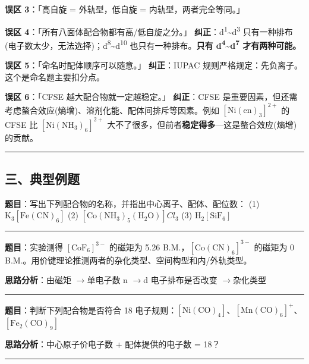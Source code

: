 \documentclass[a4paper,11pt]{ctexart}
\newcommand{\箭}{\ensuremath{\rightarrow}}
\newcommand{\左箭}{\ensuremath{\leftarrow}}
\newcommand{\上箭}{\ensuremath{\uparrow}}
\newcommand{\下箭}{\ensuremath{\downarrow}}
\newcommand{\衡}{\ensuremath{\rightleftharpoons}}
\newcommand{\双箭}{\ensuremath{\leftrightarrow}}
\newcommand{\约等于}{\ensuremath{\approx}}
\newcommand{\小于等于}{\ensuremath{\leq}}
\newcommand{\大于等于}{\ensuremath{\geq}}
\newcommand{\不等于}{\ensuremath{\neq}}
\newcommand{\西格马}{\ensuremath{\sigma}}
\newcommand{\派}{\ensuremath{\pi}}
\begin{document}
\textbf{误区 3}：「高自旋 = 外轨型，低自旋 = 内轨型，两者完全等同。」

\textbf{误区 4}：「所有八面体配合物都有高/低自旋之分。」
\textbf{纠正}：d\textsuperscript{1}\textasciitilde d\textsuperscript{3} 只有一种排布(电子数太少，无法选择)；d\textsuperscript{8}\textasciitilde d\textsuperscript{10} 也只有一种排布。\textbf{只有 d\textsuperscript{4}\textasciitilde d\textsuperscript{7} 才有两种可能。}

\textbf{误区 5}：「命名时配体顺序可以随意。」
\textbf{纠正}：IUPAC 规则严格规定：先负离子。这个是命名题主要扣分点。

\textbf{误区 6}：「CFSE 越大配合物就一定越稳定。」
\textbf{纠正}：CFSE 是重要因素，但还需考虑螯合效应(熵增)、溶剂化能、配体间排斥等因素。例如 \([\mathrm{Ni(en)_3}]^{2+}\) 的 CFSE 比 \([\mathrm{Ni(NH_3)_6}]^{2+}\) 大不了很多，但前者\textbf{稳定得多}---这是螯合效应(熵增)的贡献。

\begin{center}\rule{0.5\linewidth}{0.5pt}\end{center}

\subsection{三、典型例题}\label{ux4e09ux5178ux578bux4f8bux9898}

\textbf{题目}：写出下列配合物的名称，并指出中心离子、配体、配位数：
(1) \(\mathrm{K_3[Fe(CN)_6]}\) (2) \([\mathrm{Co(NH_3)_5(H_2O)}]Cl_3\) (3) \(\mathrm{H_2[SiF_6]}\)

\begin{center}\rule{0.5\linewidth}{0.5pt}\end{center}

\textbf{题目}：实验测得 \([\mathrm{CoF_6}]^{3-}\) 的磁矩为 5.26 B.M.，\([\mathrm{Co(CN)_6}]^{3-}\) 的磁矩为 0 B.M.。用价键理论推测两者的杂化类型、空间构型和内/外轨类型。

\textbf{思路分析}：由磁矩 \箭 单电子数 n \箭 d 电子排布是否改变 \箭 杂化类型

\begin{center}\rule{0.5\linewidth}{0.5pt}\end{center}

\textbf{题目}：判断下列配合物是否符合 18 电子规则：\(\mathrm{[Ni(CO)_4]}\)、\(\mathrm{[Mn(CO)_6]^+}\)、\(\mathrm{[Fe_2(CO)_9]}\)

\textbf{思路分析}：中心原子价电子数 + 配体提供的电子数 = 18？

\begin{center}\rule{0.5\linewidth}{0.5pt}\end{center}
\end{document}
